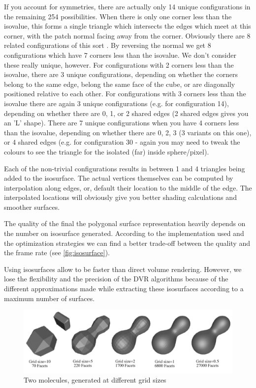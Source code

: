If you account for symmetries, there are actually only 14 unique configurations in the remaining 254 possibilities. When there is only one corner less than the isovalue, this forms a single triangle which intersects the edges which meet at this corner, with the patch normal facing away from the corner. Obviously there are 8 related configurations of this sort . By reversing the normal we get 8 configurations which have 7 corners less than the isovalue. We don't consider these really unique, however. For configurations with 2 corners less than the isovalue, there are 3 unique configurations, depending on whether the corners belong to the same edge, belong the same face of the cube, or are diagonally positioned relative to each other. For configurations with 3 corners less than the isovalue there are again 3 unique configurations (e.g. for configuration 14), depending on whether there are 0, 1, or 2 shared edges (2 shared edges gives you an 'L' shape). There are 7 unique configurations when you have 4 corners less than the isovalue, depending on whether there are 0, 2, 3 (3 variants on this one), or 4 shared edges (e.g. for configuration 30 - again you may need to tweak the colours to see the triangle for the isolated (far) inside sphere/pixel).

Each of the non-trivial configurations results in between 1 and 4 triangles being added to the isosurface. The actual vertices themselves can be computed by interpolation along edges, or, default their location to the middle of the edge. The interpolated locations will obviously give you better shading calculations and smoother surfaces.

The quality of the final the polygonal surface representation heavily depends on the number on isosurface generated. According to the implementation used and the optimization strategies we can find a better trade-off between the quality and the frame rate (see \autoref{fig:isosurface}). 


Using isosurfaces allow to be faster than direct volume rendering. However, we lose the flexibility and the precision of the DVR algorithms because of the different approximations made while extracting these isosurfaces according to a maximum number of surfaces. 


\begin{figure}
\centering
\includegraphics[width=\textwidth]{Figures/isosurface}
\caption[Volume raycasting]{ Two  molecules, generated at different grid sizes }
\label{fig:isosurface}
\end{figure}


